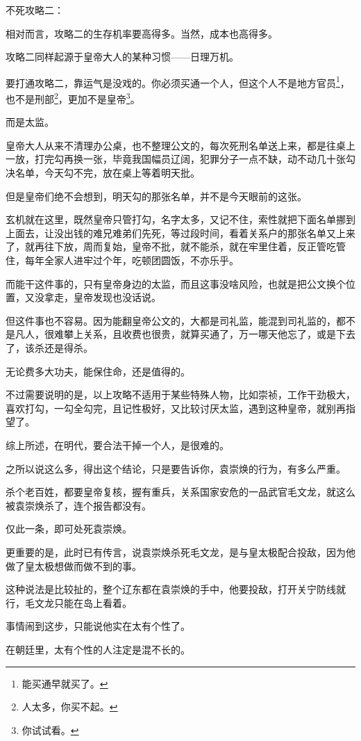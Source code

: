 \begin{multicols}{\theparacolNo}
不死攻略二：

相对而言，攻略二的生存机率要高得多。当然，成本也高得多。

攻略二同样起源于皇帝大人的某种习惯——日理万机。

要打通攻略二，靠运气是没戏的。你必须买通一个人，但这个人不是地方官员\footnote{能买通早就买了。}，也不是刑部\footnote{人太多，你买不起。}，更加不是皇帝\footnote{你试试看。}。

而是太监。

皇帝大人从来不清理办公桌，也不整理公文的，每次死刑名单送上来，都是往桌上一放，打完勾再换一张，毕竟我国幅员辽阔，犯罪分子一点不缺，动不动几十张勾决名单，今天勾不完，放在桌上等着明天批。

但是皇帝们绝不会想到，明天勾的那张名单，并不是今天眼前的这张。

玄机就在这里，既然皇帝只管打勾，名字太多，又记不住，索性就把下面名单挪到上面去，让没出钱的难兄难弟们先死，等过段时间，看着关系户的那张名单又上来了，就再往下放，周而复始，皇帝不批，就不能杀，就在牢里住着，反正管吃管住，每年全家人进牢过个年，吃顿团圆饭，不亦乐乎。

而能干这件事的，只有皇帝身边的太监，而且这事没啥风险，也就是把公文换个位置，又没拿走，皇帝发现也没话说。

但这件事也不容易。因为能翻皇帝公文的，大都是司礼监，能混到司礼监的，都不是凡人，很难攀上关系，且收费也很贵，就算买通了，万一哪天他忘了，或是下去了，该杀还是得杀。

无论费多大功夫，能保住命，还是值得的。

不过需要说明的是，以上攻略不适用于某些特殊人物，比如崇祯，工作干劲极大，喜欢打勾，一勾全勾完，且记性极好，又比较讨厌太监，遇到这种皇帝，就别再指望了。

综上所述，在明代，要合法干掉一个人，是很难的。

之所以说这么多，得出这个结论，只是要告诉你，袁崇焕的行为，有多么严重。

杀个老百姓，都要皇帝复核，握有重兵，关系国家安危的一品武官毛文龙，就这么被袁崇焕杀了，连个报告都没有。

仅此一条，即可处死袁崇焕。

更重要的是，此时已有传言，说袁崇焕杀死毛文龙，是与皇太极配合投敌，因为他做了皇太极想做而做不到的事。

这种说法是比较扯的，整个辽东都在袁崇焕的手中，他要投敌，打开关宁防线就行，毛文龙只能在岛上看着。

事情闹到这步，只能说他实在太有个性了。

在朝廷里，太有个性的人注定是混不长的。


\end{multicols}
